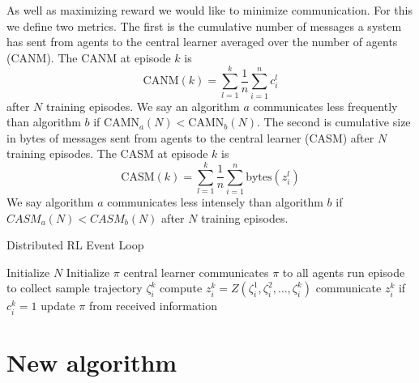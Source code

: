As well as maximizing reward we would like to minimize communication. For this we define two metrics. The first is the cumulative number of messages a system has sent from agents to the central learner averaged over the number of agents (CANM). The CANM at episode $k$  is
\begin{equation*}
    \text{CANM}(k) = \sum_{l=1}^k \frac{1}{n} \sum_{i=1}^n c_i^l
\end{equation*} 
after $N$ training episodes. We say an algorithm $a$ communicates less frequently than algorithm $b$ if $\text{CAMN}_a(N) < \text{CAMN}_b(N)$. The second is cumulative size in bytes of messages sent from agents to the central learner (CASM) after $N$ training episodes. The CASM at episode $k$ is 
\begin{equation*}
    \text{CASM}(k) = \sum_{l=1}^k \frac{1}{n} \sum_{i=1}^n \text{bytes}(z_i^l)
\end{equation*}  
We say algorithm $a$ communicates less intensely than algorithm $b$ if $CASM_a(N) < CASM_b(N)$ after $N$ training episodes.


\begin{algorithm}
        \caption{Distributed RL Event Loop}\label{alg:EventLoop}
        \begin{algorithmic}
                \State Initialize $N$ 
                \State Initialize $\pi$
                \State central learner communicates $\pi$ to all agents
                \State run episode to collect sample trajectory $\zeta^k_i$ %
                \State compute $z^k_i = Z(\zeta^1_i,\zeta^2_i,\dots, \zeta^k_i)$
                \State communicate $z^k_i$ if $c^k_i = 1$
                \EndFor
                \State update $\pi$ from received information
                \EndFor
        \end{algorithmic}
\end{algorithm}

\section{New algorithm}
